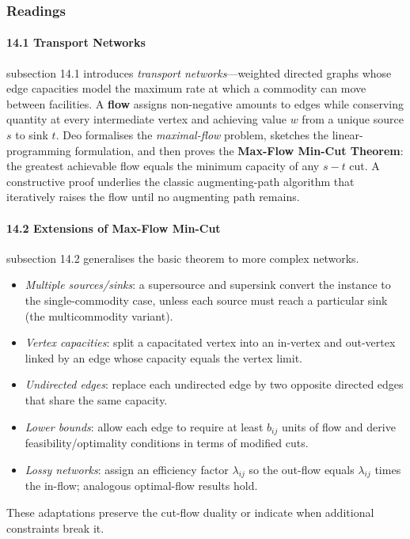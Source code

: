 \documentclass{article}
\theoremstyle{theorem}
\theoremstyle{definition}
\theoremstyle{remark}
\begin{document}
\subsubsection{Readings}

\paragraph*{\textbf{14.1} Transport Networks}
subsection 14.1 introduces \emph{transport networks}—weighted directed graphs whose edge capacities model the maximum rate at which a commodity can move between facilities.  A \textbf{flow} assigns non-negative amounts to edges while conserving quantity at every intermediate vertex and achieving value \(w\) from a unique source \(s\) to sink \(t\).  Deo formalises the \emph{maximal-flow} problem, sketches the linear-programming formulation, and then proves the \textbf{Max-Flow Min-Cut Theorem}: the greatest achievable flow equals the minimum capacity of any \(s\!-\!t\) cut.  A constructive proof underlies the classic augmenting-path algorithm that iteratively raises the flow until no augmenting path remains. \cite{Deo}

\paragraph*{\textbf{14.2} Extensions of Max-Flow Min-Cut}
subsection 14.2 generalises the basic theorem to more complex networks.  
\begin{itemize}[nosep]
  \item \emph{Multiple sources/sinks}: a supersource and supersink convert the instance to the single-commodity case, unless each source must reach a particular sink (the multicommodity variant).  
  \item \emph{Vertex capacities}: split a capacitated vertex into an in-vertex and out-vertex linked by an edge whose capacity equals the vertex limit.  
  \item \emph{Undirected edges}: replace each undirected edge by two opposite directed edges that share the same capacity.  
  \item \emph{Lower bounds}: allow each edge to require at least \(b_{ij}\) units of flow and derive feasibility/optimality conditions in terms of modified cuts.  
  \item \emph{Lossy networks}: assign an efficiency factor \(\lambda_{ij}\) so the out-flow equals \(\lambda_{ij}\) times the in-flow; analogous optimal-flow results hold.  
\end{itemize}
These adaptations preserve the cut-flow duality or indicate when additional constraints break it. \cite{Deo}
\end{document}
